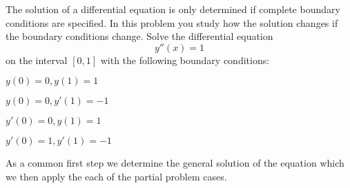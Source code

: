 The solution of a differential equation is only determined if
complete boundary conditions are specified.
In this problem you study how the solution changes if the boundary
conditions change.
Solve the differential equation
\[
y''(x)=1
\]
on the interval $[0,1]$ with the following boundary conditions:
\begin{teilaufgaben}
\item $y(0)=0, y(1)=1$
\item $y(0)=0, y'(1)=-1$
\item $y'(0)=0, y(1)=1$
\item $y'(0)=1, y'(1)=-1$
\end{teilaufgaben}

\begin{loesung}
As a common first step we determine the general solution of the
equation which we then apply the each of the partial problem cases.


\end{loesung}
